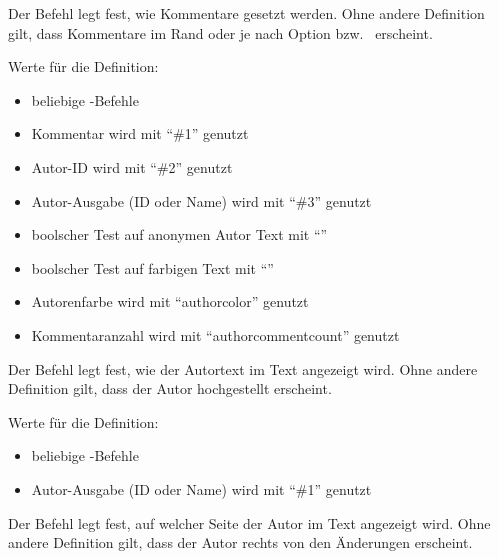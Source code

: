 

Der Befehl  legt fest, wie Kommentare gesetzt werden.
Ohne andere Definition gilt, dass Kommentare im Rand oder je nach Option  bzw.\  erscheint.

Werte für die Definition:

\begin{itemize}
	\item beliebige -Befehle
	\item Kommentar wird mit "`\#1"' genutzt
	\item Autor-ID wird mit ``\#2'' genutzt
	\item Autor-Ausgabe (ID oder Name) wird mit ``\#3'' genutzt
	\item {} boolscher Test auf anonymen Autor Text mit ``''
	\item {} boolscher Test auf farbigen Text mit ``''
	\item Autorenfarbe wird mit ``authorcolor'' genutzt
	\item Kommentaranzahl wird mit ``authorcommentcount'' genutzt
\end{itemize}





Der Befehl  legt fest, wie der Autortext im Text angezeigt wird.
Ohne andere Definition gilt, dass der Autor hochgestellt erscheint.

Werte für die Definition:

\begin{itemize}
	\item beliebige -Befehle
	\item Autor-Ausgabe (ID oder Name) wird mit ``\#1'' genutzt
\end{itemize}





Der Befehl  legt fest, auf welcher Seite der Autor im Text angezeigt wird.
Ohne andere Definition gilt, dass der Autor rechts von den Änderungen erscheint.

